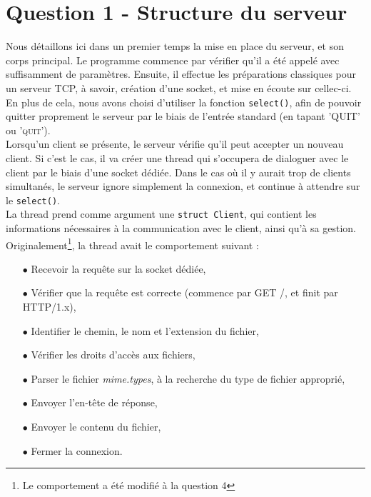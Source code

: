 \documentclass[final,12pt]{article}
\begin{document}
\section*{\textbf{Question 1} - Structure du serveur {\color{green}\checkmark}}
	Nous détaillons ici dans un premier temps la mise en place du serveur, et son corps principal.
	Le programme commence par vérifier qu'il a été appelé avec suffisamment de paramètres.
	Ensuite, il effectue les préparations classiques pour un serveur TCP, à savoir, création d'une socket,
	et mise en écoute sur cellec-ci. En plus de cela, nous avons choisi d'utiliser la fonction \texttt{select()}, afin de pouvoir quitter proprement le serveur par le biais de l'entrée standard (en tapant \textsc{'QUIT'} ou \textsc{'quit'}).\\
	Lorsqu'un client se présente, le serveur vérifie qu'il peut accepter un nouveau client. Si c'est le cas, il va créer une thread qui s'occupera de dialoguer avec le client par le biais d'une socket dédiée. Dans le cas où il y aurait trop de clients simultanés, le serveur ignore simplement la connexion, et continue à attendre sur le \texttt{select()}.\\
	La thread prend comme argument une \texttt{struct Client}, qui contient les informations nécessaires à la communication avec le client, ainsi qu'à sa gestion.
	Originalement\footnote{Le comportement a été modifié à la question 4}, la thread avait le comportement suivant : 
	\begin{itemize}
		\item[$\bullet$] Recevoir la requête sur la socket dédiée,
		\item[$\bullet$] Vérifier que la requête est correcte (commence par \textsf{GET /}, et finit par \textsf{HTTP/1.x}),
		\item[$\bullet$] Identifier le chemin, le nom et l'extension du fichier,
		\item[$\bullet$] Vérifier les droits d'accès aux fichiers,
		\item[$\bullet$] Parser le fichier \textsl{mime.types}, à la recherche du type de fichier approprié,
		\item[$\bullet$] Envoyer l'en-tête de réponse,
		\item[$\bullet$] Envoyer le contenu du fichier,
		\item[$\bullet$] Fermer la connexion.
	\end{itemize}
\end{document}

